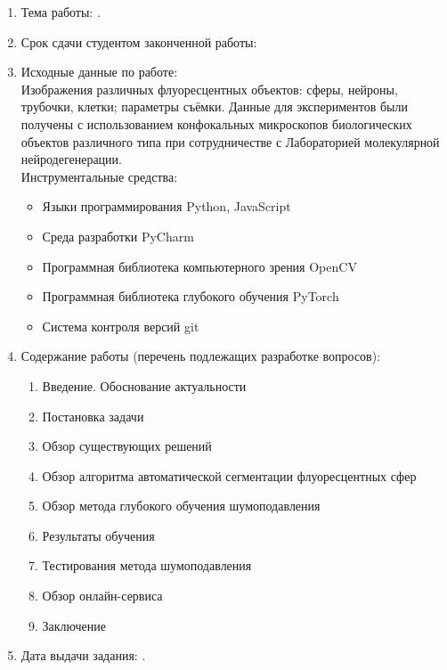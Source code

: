 \begin{enumerate}[1.]
	\item Тема работы: {\expandafter \thesisTitle.}
	\item Срок сдачи студентом законченной работы: \thesisDeadline 
	\item Исходные данные по работе:\\ Изображения различных флуоресцентных объектов: сферы, нейроны, трубочки, клетки; параметры съёмки. Данные для экспериментов были получены с использованием конфокальных микроскопов биологических объектов различного типа при сотрудничестве с Лабораторией молекулярной нейродегенерации.\\
	Инструментальные средства:
	\begin{itemize}
		\item Языки программирования Python, JavaScript 
		\item Среда разработки PyCharm
		\item Программная библиотека компьютерного зрения OpenCV
		\item Программная библиотека глубокого обучения PyTorch
		\item Система контроля версий git
	\end{itemize}
	\item Содержание работы (перечень подлежащих разработке вопросов):
	\begin{enumerate}[label=\theenumi\arabic*.]
		\item Введение. Обоснование актуальности
		\item Постановка задачи
		\item Обзор существующих решений
		\item Обзор алгоритма автоматической сегментации флуоресцентных сфер
		\item Обзор метода глубокого обучения шумоподавления
		\item Результаты обучения
		\item Тестирования метода шумоподавления
		\item Обзор онлайн-сервиса
		\item Заключение
	\end{enumerate}
		\item Дата выдачи задания: \thesisStartDate.
\end{enumerate}

